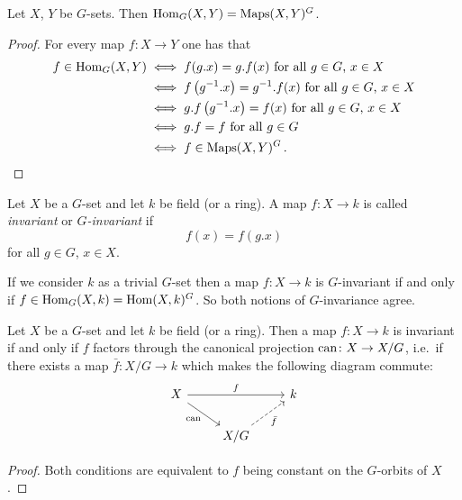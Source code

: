 \begin{lemma}
  \label{lemma: equivariants are invariants}
  Let $X$, $Y$ be $G$-sets.
  Then $\operatorname{Hom}_G(X,Y) = \operatorname{Maps}(X,Y)^G$.
\end{lemma}
\begin{proof}
  For every map $f \colon X \to Y$ one has that
  \begin{align*}
          f \in \operatorname{Hom}_G(X,Y)
    &\iff \text{$f(g.x) = g.f(x)$ for all $g \in G$, $x \in X$} \\
    &\iff \text{$f\left( g^{-1}.x \right) = g^{-1}.f(x)$ for all $g \in G$, $x \in X $} \\
    &\iff \text{$g.f\left( g^{-1}.x \right) = f(x)$ for all $g \in G$, $x \in X$} \\
    &\iff \text{$g.f = f$ for all $g \in G$}  \\
    &\iff f \in \operatorname{Maps}(X,Y)^G \,.
    \qedhere
  \end{align*}
\end{proof}


\begin{definition}
  Let $X$ be a $G$-set and let $k$ be field (or a ring).
  A map $f \colon X \to k$ is called \emph{invariant} or \emph{$G$-invariant} if
  \[
      f(x)
    = f\left( g.x \right)
  \]
  for all $g \in G$, $x \in X$.
\end{definition}


\begin{fluff}
  If we consider $k$ as a trivial $G$-set then a map $f \colon X \to k$ is $G$-invariant if and only if $f \in \operatorname{Hom}_G(X,k) = \operatorname{Hom}(X,k)^G$.
  So both notions of $G$-invariance agree.
\end{fluff}


\begin{lemma}
  Let $X$ be a $G$-set and let $k$ be field (or a ring).
  Then a map $f \colon X \to k$ is invariant if and only if $f$ factors through the canonical projection $\operatorname{can} \colon X \to X/G$, i.e.\ if there exists a map $\bar{f} \colon X/G \to k$ which makes the following diagram commute:
  \[
    \begin{tikzcd}
        X
        \arrow{rr}{f}
        \arrow[swap]{rd}{\can}
      & {}
      & k
      \\
        {}
      & X/G
        \arrow[swap, dashed]{ru}{\bar{f}}
      & {}
    \end{tikzcd}
  \]
\end{lemma}
\begin{proof}
  Both conditions are equivalent to $f$ being constant on the $G$-orbits of $X$.
\end{proof}


